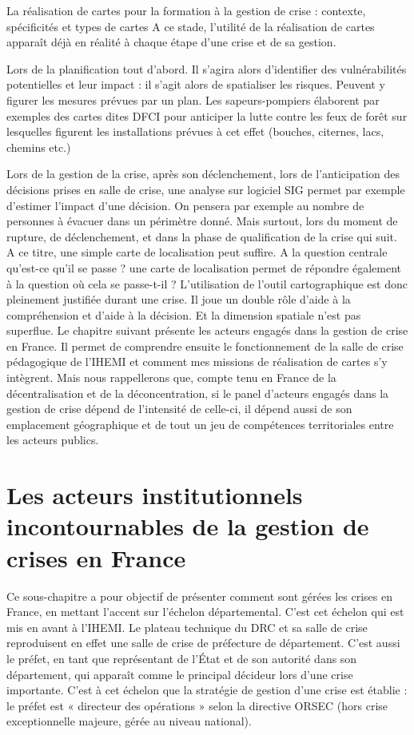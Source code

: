 \documentclass[10pt,a4paper]{report} %
\begin{document}
\begin{part}{La réalisation de cartes pour la formation à la gestion de crise : contexte, spécificités et types de cartes}
A ce stade, l’utilité de la réalisation de cartes apparaît déjà en réalité à chaque étape d’une crise et de sa gestion. 

Lors de la planification tout d’abord. Il s’agira alors d’identifier des vulnérabilités potentielles et leur impact : il s’agit alors de spatialiser les risques. Peuvent y figurer les mesures prévues par un plan. Les sapeurs-pompiers élaborent par exemples des cartes dites DFCI pour anticiper la lutte contre les feux de forêt sur lesquelles figurent les installations prévues à cet effet (bouches, citernes, lacs, chemins etc.)

Lors de la gestion de la crise, après son déclenchement, lors de l’anticipation des décisions prises en salle de crise, une analyse sur logiciel SIG permet par exemple d’estimer l’impact d’une décision. On pensera par exemple au nombre de personnes à évacuer dans un périmètre donné. Mais surtout, lors du moment de rupture, de déclenchement, et dans la phase de qualification de la crise qui suit. A ce titre, une simple carte de localisation peut suffire. A la question centrale qu’est-ce qu’il se passe ? une carte de localisation permet de répondre également à la question où cela se passe-t-il ? L’utilisation de l’outil cartographique est donc pleinement justifiée durant une crise. Il joue un double rôle d’aide à la compréhension et d’aide à la décision. Et la dimension spatiale n’est pas superflue. Le chapitre suivant présente les acteurs engagés dans la gestion de crise en France. Il permet de comprendre ensuite le fonctionnement de la salle de crise pédagogique de l’IHEMI et comment mes missions de réalisation de cartes s’y intègrent. Mais nous rappellerons que, compte tenu en France de la décentralisation et de la déconcentration, si le panel d’acteurs engagés dans la gestion de crise dépend de l’intensité de celle-ci, il dépend aussi de son emplacement géographique et de tout un jeu de compétences territoriales entre les acteurs publics.

\section{Les acteurs institutionnels incontournables de la gestion de crises en France}

Ce sous-chapitre a pour objectif de présenter comment sont gérées les crises en France, en mettant l’accent sur l’échelon départemental. C’est cet échelon qui est mis en avant à l’IHEMI. Le plateau technique du DRC et sa salle de crise reproduisent en effet une salle de crise de préfecture de département. C’est aussi le préfet, en tant que représentant de l’État et de son autorité dans son département, qui apparaît comme le principal décideur lors d’une crise importante. C’est à cet échelon que la stratégie de gestion d’une crise est établie : le préfet est « directeur des opérations » selon la directive ORSEC (hors crise exceptionnelle majeure, gérée au niveau national).


\end{part}
\end{document}
